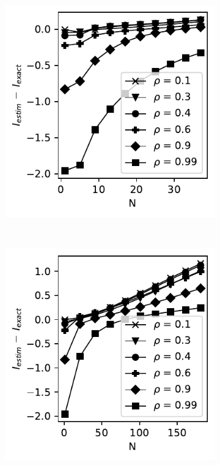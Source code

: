 \documentclass[../Thesis.tex]{subfiles}
\begin{document}
\begin{figure}[H]
    \centering
    \begin{subfigure}[t]{0.4\textwidth}
        \centering
        \includegraphics[width=\linewidth]{figures/ND examples/MI calc/gaussian example original zoom - M-spline - error.pdf}
        \caption{}
    \end{subfigure}%
    ~
    \begin{subfigure}[t]{0.4\textwidth}
        \centering
        \includegraphics[width=\linewidth]{figures/ND examples/MI calc/gaussian example original all - M-spline - error.pdf}

\end{subfigure}
\end{figure}
\end{document}
